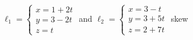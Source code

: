 {$\ell_1 = \begin{cases}x=1+2t\\y=3-2t\\z=t\end{cases}$ \quad and \quad
$\ell_2 = \begin{cases}x=3-t\\y=3+5t\\z=2+7t\end{cases}$
}
{skew
}

